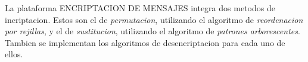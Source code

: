 La plataforma E\+N\+C\+R\+I\+P\+T\+A\+C\+I\+ON DE M\+E\+N\+S\+A\+J\+ES integra dos metodos de incriptacion. Estos son el de {\itshape permutacion}, utilizando el algoritmo de {\itshape reordenacion por rejillas}, y el de {\itshape sustitucion}, utilizando el algoritmo de {\itshape patrones arborescentes}. Tambien se implementan los algoritmos de desencriptacion para cada uno de ellos. 